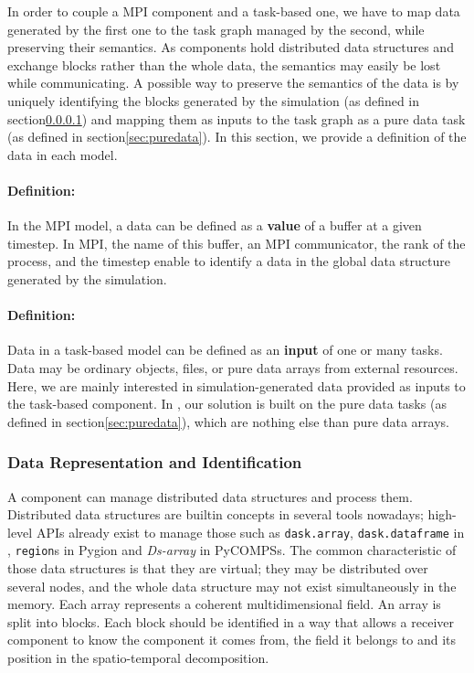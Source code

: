 In order to couple a MPI component and a task-based one, we have to map data generated by the first one to the task graph managed by the second, while preserving their semantics. As \deisa components hold distributed data structures and exchange blocks rather than the whole data, the semantics may easily be lost while communicating.  
A possible way to preserve the semantics of the data is by uniquely identifying the blocks generated by the simulation (as defined in section\ref{defdataBSP}) and mapping them as inputs to the task graph as a pure data task (as defined in section\ref{sec:puredata}). 
In this section, we provide a definition of the data in each model.

\paragraph{Definition:}\label{defdataBSP}
In the MPI model, a data can be defined as a \textbf{value} of a buffer at a given timestep. In MPI, the name of this buffer, an MPI communicator, the rank of the process, and the timestep enable to identify a data in the global data structure generated by the simulation. 

\paragraph{Definition:}\label{defdatataskbased}
Data in a task-based model can be defined as an \textbf{input} of one or many tasks. Data may be ordinary objects, files, or pure data arrays from external resources. Here, we are mainly interested in simulation-generated data provided as inputs to the task-based component. In \dask,  our solution is built on the pure data tasks (as defined in section\ref{sec:puredata}), which are nothing else than pure data arrays. 


\subsubsection{Data Representation and Identification}

A \deisa component can manage distributed data structures and process them. Distributed data structures are builtin concepts in several tools nowadays; high-level APIs already exist to manage those such as \texttt{dask.array}, \texttt{dask.dataframe} in \dask, \texttt{region}s in Pygion and \textit{Ds-array} in PyCOMPSs. 
The common characteristic of those data structures is that they are virtual; they may be distributed over several nodes, and the whole data structure may not exist simultaneously in the memory. 
Each array represents a coherent multidimensional field. An array is split into blocks. Each block should be identified in a way that allows a receiver component to know the component it comes from, the field it belongs to and its position in the spatio-temporal decomposition. 

